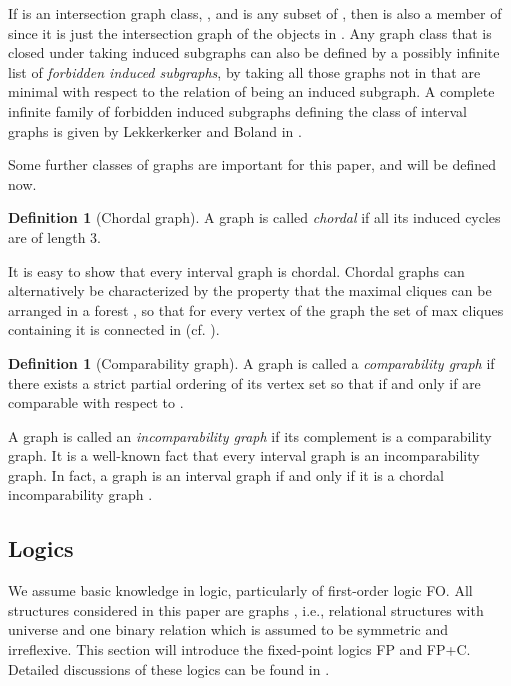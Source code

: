 \documentclass[10pt]{article}
\theoremstyle{remark}
\theoremstyle{definition}
\newtheorem{definition}[thm]{Definition}
\theoremstyle{plain}
\newcommand{\logic}[1]{\textsf{\upshape\relsize{-0.5}#1}\xspace}
\newcommand{\FP}{\logic{FP}}
\newcommand{\FPC}{\logic{FP+C}}
\newcommand{\FOL}{\logic{FO}}
\begin{document}
If  is an intersection graph class, , and  is any subset of , then  is also a member of  since it is just the intersection graph of the objects in . Any graph class  that is closed under taking induced subgraphs can also be defined by a possibly infinite list of \emph{forbidden induced subgraphs}, by taking all those graphs not in  that are minimal with respect to the relation of being an induced subgraph. A complete infinite family of forbidden induced subgraphs defining the class of interval graphs is given by Lekkerkerker and Boland in \cite{lekkerkerker62representation}.



Some further classes of graphs are important for this paper, and will be defined now.

\begin{definition}[Chordal graph]
A graph is called \emph{chordal} if all its induced cycles are of length 3.
\end{definition}

It is easy to show that every interval graph is chordal. Chordal graphs can alternatively be characterized by the property that the maximal cliques can be arranged in a forest , so that for every vertex of the graph the set of max cliques containing it is connected in  (cf. \cite{diestel06graphtheory}).



\begin{definition}[Comparability graph]
A graph  is called a \emph{comparability graph} if there exists a strict partial ordering  of its vertex set  so that  if and only if  are comparable with respect to .
\end{definition}

A graph is called an \emph{incomparability graph} if its complement is a comparability graph. It is a well-known fact that every interval graph is an incomparability graph. In fact, a graph is an interval graph if and only if it is a chordal incomparability graph \cite{gilmore64characterization, golumbic04algorithmic}.




\subsection{Logics}

We assume basic knowledge in logic, particularly of first-order logic \FOL. All structures considered in this paper are graphs , i.e., relational structures with universe  and one binary relation  which is assumed to be symmetric and irreflexive. This section will introduce the fixed-point logics \FP and \FPC. Detailed discussions of these logics can be found in \cite{ebbinghaus99finite, graedel07finite, immerman99descriptive}.
\end{document}
